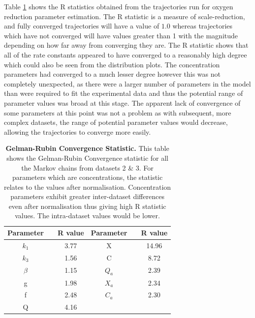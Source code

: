 Table \ref{tab:oxyRstat} shows the R statistics obtained from the trajectories run for oxygen reduction parameter estimation. The R statistic is a measure of scale-reduction, and fully converged trajectories will have a value of $1.0$ whereas trajectories which have not converged will have values greater than 1 with the magnitude depending on how far away from converging they are. The R statistic shows that all of the rate constants appeared to have converged to a reasonably high degree which could also be seen from the distribution plots. The concentration parameters had converged to a much lesser degree however this was not completely unexpected, as there were a larger number of parameters in the model than were required to fit the experimental data and thus the potential range of parameter values was broad at this stage. The apparent lack of convergence of some parameters at this point was not a problem as with subsequent, more complex datasets, the range of potential parameter values would decrease, allowing the trajectories to converge more easily.
\begin{table}[tbp]%
\renewcommand{\arraystretch}{1.5}
\begin{center}
\begin{tabular}{ccc|ccc}
\toprule
\textbf{Parameter} && \textbf{R value} & \textbf{Parameter} && \textbf{R value}\\
\midrule
$k_1$ && 3.77 & X && 14.96\\
$k_3$ && 1.56 & C && 8.72\\
$\beta$ && 1.15 & $Q_a$ && 2.39\\
g && 1.98 & $X_a$ && 2.34\\
f && 2.48 & $C_a$ && 2.30\\
Q && 4.16\\
\bottomrule
\end{tabular}
\end{center}
\caption[Gelman-Rubin Convergence Statistic]{{\bf Gelman-Rubin Convergence Statistic.} This table shows the Gelman-Rubin Convergence statistic for all the Markov chains from datasets 2 \& 3. For parameters which are concentrations, the statistic relates to the values after normalisation. Concentration parameters exhibit greater inter-dataset differences even after normalisation thus giving high R statistic values. The intra-dataset values would be lower.
\label{tab:oxyRstat}}
\end{table}

